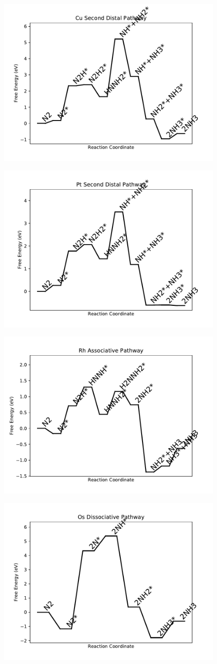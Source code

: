 \documentclass[journal=jacsat,manuscript=article]{achemso}
\begin{document}
\begin{figure}
\includegraphics[width=0.5\linewidth]{data/plots/Cu_distal_2.pdf}
\label{fig:Cu_distal_2}
\end{figure}

\begin{figure}
\includegraphics[width=0.5\linewidth]{data/plots/Pt_distal_2.pdf}
\label{fig:Pt_distal_2}
\end{figure}

\begin{figure}
\includegraphics[width=0.5\linewidth]{data/plots/Rh_associative.pdf}
\label{fig:Rh_associative}
\end{figure}

\begin{figure}
\includegraphics[width=0.5\linewidth]{data/plots/Os_dissociative.pdf}
\label{fig:Os_dissociative}
\end{figure}
\end{document}
